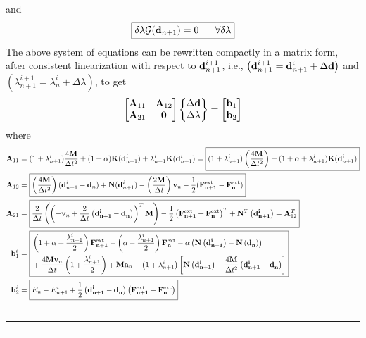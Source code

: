 and
\begin{align*}
\boxed{
\delta \lambda \mathcal{G}({\bf d}_{n+1})=0 \ \ \ \ \ \forall \delta\lambda
}
\end{align*}
The above system of equations can be rewritten compactly in a matrix form, after consistent linearization with respect to ${\bf d}^{i+1}_{n+1}$, i.e., $\left({\bf d}^{i+1}_{n+1} = {{\bf d}^{i}_{n+1}} + {\Delta {\bf d}}\right)$ and $\left({\lambda}^{i+1}_{n+1} = {\lambda}^{i}_{n} + \Delta \lambda\right)$, to get  
\begin{align}
\begin{bmatrix}
{\bf A}_{11} & {\bf A}_{12} \\
{\bf A}_{21} & {\bf 0}
\end{bmatrix}
\begin{Bmatrix}
\Delta {\bf d}\\
\Delta \lambda
\end{Bmatrix}
=
\begin{bmatrix}
{\bf b}_1\\
{\bf b}_2
\end{bmatrix}
\label{AXB}
\end{align}
where 
\begin{align*}
{\bf A}_{11}
& =
(1+\lambda^i_{n+1})\frac{4\bf M}{\Delta t^2} + (1+\alpha) {\bf K}({\bf d}^i_{n+1}) + \lambda^i_{n+1} {\bf K}({\bf d}^i_{n+1}) =
\boxed{ 
(1+\lambda^i_{n+1}) \left( \frac{4\bf M}{\Delta t^2}\right)
+ (1+\alpha+\lambda^i_{n+1}) {\bf K}({\bf d}^i_{n+1})} \\
{\bf A}_{12}
& =\boxed{
\left( \frac{4\bf M}{\Delta t^2}\right) ({\bf d}^i_{n+1} - {\bf d}_n)
+
{\bf N}({\bf d}^i_{n+1})
-\left( \frac{2\bf M}{\Delta t}\right){\bf v}_n - \frac{1}{2} (\bf \F{n+1}{ext}-\F{n}{ext})}\\
{\bf A}_{21} 
& =
\boxed{\frac{2}{\Delta t} \left(
\left(
-{\bf v}_n + \frac{2}{\Delta t} \left( {\bf \dis{n+1}{i} - \dis{n}{}}
\right)
\right)^T {\bf M}
\right)
-\frac{1}{2}\left({\bf \F{n+1}{ext} + \F{n}{ext}}\right)^T + {\bf N}^T\left({\bf \dis{n+1}{i}}\right)
=
{\bf A}^T_{12}}\\
{\bf b}^i_1
& = \boxed{
\begin{aligned}
& \left(
1+\alpha + \frac{\lambda^i_{n+1}}{2}
\right)
{\bf\F{n+1}{ext}} 
- \left( 
\alpha -\frac{\lambda^i_{n+1}}{2}
\right)
{\bf \F{n}{ext}} 
- \alpha 
\left( 
{\bf N}
\left(
{\bf \dis{n+1}{i}}
\right)
-
{\bf N}
\left(
{\bf \dis{n}{}}
\right)
\right)
\\ 
& + 
\frac{4{\bf M}{\bf v}_n}{\Delta t} 
\left(
1+\frac{\lambda^i_{n+1}}{2}
\right)
+
{\bf M}{\bf a}_n
-
\left(
1+\lambda^i_{n+1}
\right) \left[
{\bf N}
\left(
{\bf \dis{n+1}{i}}
\right)
+
\frac{4{\bf M}}{\Delta t^2}
\left(
{\bf \dis{n+1}{i} - \dis{n}{}}
\right)
\right]
\end{aligned}
}\\
{\bf b}^i_{2}
& =
\boxed{
E_n
-
E^i_{n+1}
+ \frac{1}{2}
\left({\bf \dis{n+1}{i} - \dis{n}{}}\right)
\left(
{\bf \F{n+1}{ext} + \F{n}{ext}}
\right)
}
\end{align*}
\hrule \hrule \hrule
